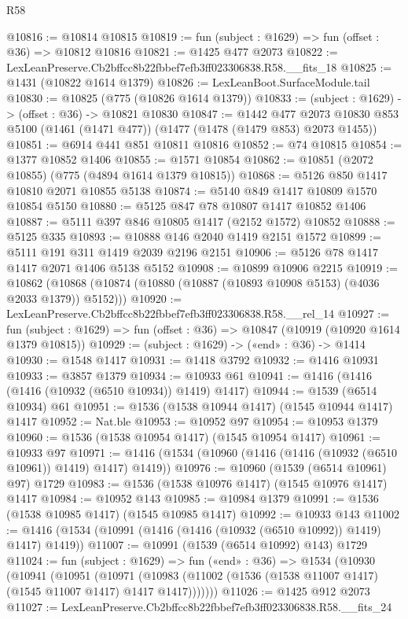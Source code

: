 \begin{lexlean}{R58}
\begin{coremodule}
{{@10816 := @10814 @10815
@10819 := fun (subject : @1629) => fun (offset : @36) => @10812 @10816
@10821 := @1425 @477 @2073
@10822 := LexLeanPreserve.Cb2bffcc8b22fbbef7efb3ff023306838.R58.__fits_18
@10825 := @1431 (@10822 @1614 @1379)
@10826 := LexLeanBoot.SurfaceModule.tail
@10830 := @10825 (@775 (@10826 @1614 @1379))
@10833 := (subject : @1629) -> (offset : @36) -> @10821 @10830
@10847 := @1442
    @477
    @2073
    @10830
    @853
    @5100
    (@1461 (@1471 @477))
    (@1477 (@1478 (@1479 @853) @2073 @1455))
@10851 := @6914 @441 @851 @10811 @10816
@10852 := @74 @10815
@10854 := @1377 @10852 @1406
@10855 := @1571 @10854
@10862 := @10851 (@2072 @10855) (@775 (@4894 @1614 @1379 @10815))
@10868 := @5126 @850 @1417 @10810 @2071 @10855 @5138
@10874 := @5140 @849 @1417 @10809 @1570 @10854 @5150
@10880 := @5125 @847 @78 @10807 @1417 @10852 @1406
@10887 := @5111 @397 @846 @10805 @1417 (@2152 @1572) @10852
@10888 := @5125 @335
@10893 := @10888 @146 @2040 @1419 @2151 @1572
@10899 := @5111 @191 @311 @1419 @2039 @2196 @2151
@10906 := @5126 @78 @1417 @1417 @2071 @1406 @5138 @5152
@10908 := @10899 @10906 @2215
@10919 := @10862 (@10868 (@10874 (@10880 (@10887 (@10893 @10908 @5153) (@4036 @2033 @1379)) @5152)))
@10920 := LexLeanPreserve.Cb2bffcc8b22fbbef7efb3ff023306838.R58.__rel_14
@10927 := fun (subject : @1629) => fun (offset : @36) => @10847 (@10919 (@10920 @1614 @1379 @10815))
@10929 := (subject : @1629) -> («end» : @36) -> @1414
@10930 := @1548 @1417
@10931 := @1418 @3792
@10932 := @1416 @10931
@10933 := @3857 @1379
@10934 := @10933 @61
@10941 := @1416 (@1416 (@1416 (@10932 (@6510 @10934)) @1419) @1417)
@10944 := @1539 (@6514 @10934) @61
@10951 := @1536 (@1538 @10944 @1417) (@1545 @10944 @1417) @1417
@10952 := Nat.ble
@10953 := @10952 @97
@10954 := @10953 @1379
@10960 := @1536 (@1538 @10954 @1417) (@1545 @10954 @1417)
@10961 := @10933 @97
@10971 := @1416 (@1534 (@10960 (@1416 (@1416 (@10932 (@6510 @10961)) @1419) @1417) @1419))
@10976 := @10960 (@1539 (@6514 @10961) @97) @1729
@10983 := @1536 (@1538 @10976 @1417) (@1545 @10976 @1417) @1417
@10984 := @10952 @143
@10985 := @10984 @1379
@10991 := @1536 (@1538 @10985 @1417) (@1545 @10985 @1417)
@10992 := @10933 @143
@11002 := @1416 (@1534 (@10991 (@1416 (@1416 (@10932 (@6510 @10992)) @1419) @1417) @1419))
@11007 := @10991 (@1539 (@6514 @10992) @143) @1729
@11024 := fun (subject : @1629) =>
  fun («end» : @36) =>
  @1534
    (@10930
      (@10941
        (@10951
          (@10971
            (@10983 (@11002 (@1536 (@1538 @11007 @1417) (@1545 @11007 @1417) @1417 @1417)))))))
@11026 := @1425 @912 @2073
@11027 := LexLeanPreserve.Cb2bffcc8b22fbbef7efb3ff023306838.R58.__fits_24
}}
\end{coremodule}
\end{lexlean}
